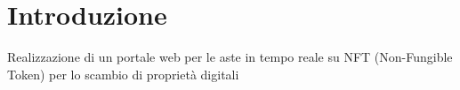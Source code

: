 \section{Introduzione}
Realizzazione di un portale web per le aste in tempo reale su NFT (Non-Fungible Token) per lo scambio di proprietà digitali

\citep{adams1995hitchhiker}
